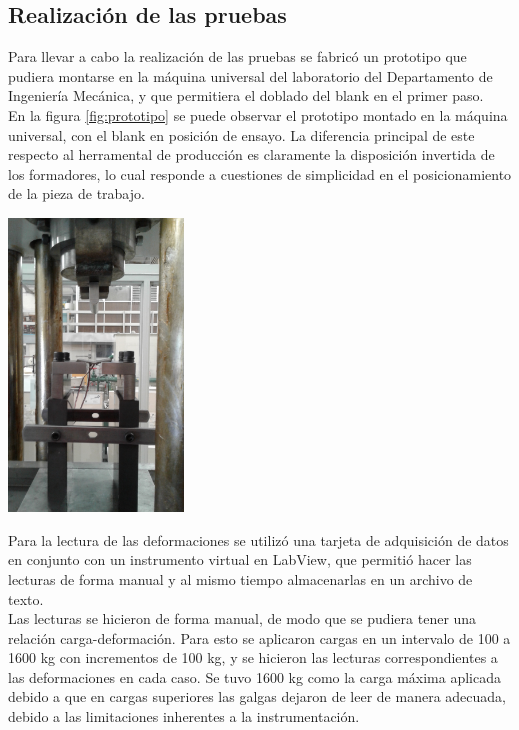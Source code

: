 \subsection{Realización de las pruebas}

Para llevar a cabo la realización de las pruebas se fabricó un prototipo que pudiera montarse en 
la máquina universal del laboratorio del Departamento de Ingeniería Mecánica, y que permitiera 
el doblado del blank en el primer paso.\\

En la figura \ref{fig:prototipo} se puede observar el prototipo montado en la máquina universal, con 
el blank en posición de ensayo. La diferencia principal de este respecto al herramental de producción 
es claramente la disposición invertida de los formadores, lo cual responde a cuestiones de simplicidad 
en el posicionamiento de la pieza de trabajo.

\begin{center}
\includegraphics[width=0.35\textwidth]{src/ch3/prototipo.jpg}
\label{fig:prototipo}
\end{center}

Para la lectura de las deformaciones se utilizó una tarjeta de adquisición de datos en conjunto con 
un instrumento virtual en LabView\CR, que permitió hacer las lecturas de forma manual y al mismo tiempo 
almacenarlas en un archivo de texto. \\

Las lecturas se hicieron de forma manual, de modo que se pudiera tener una relación carga-deformación. 
Para esto se aplicaron cargas en un intervalo de 100 a 1600 kg con incrementos de 100 kg, y se hicieron 
las lecturas correspondientes a las deformaciones en cada caso. Se tuvo 1600 kg como la carga máxima 
aplicada debido a que en cargas superiores las galgas dejaron de leer de manera adecuada, debido a las 
limitaciones inherentes a la instrumentación.